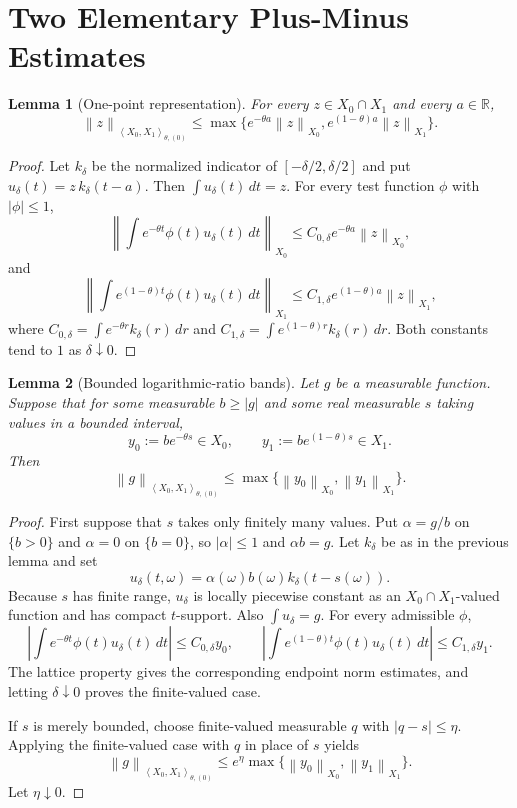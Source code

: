 \documentclass[11pt]{article}
\newtheorem{lemma}{Lemma}
\newcommand{\PM}{\left\langle X_0,X_1\right\rangle_{\theta,(0)}}
\newcommand{\norm}[1]{\left\lVert #1\right\rVert}
\begin{document}
\section*{Two Elementary Plus-Minus Estimates}

\begin{lemma}[One-point representation]
\label{lem:point}
For every $z\in X_0\cap X_1$ and every $a\in\mathbb R$,
\[
\norm{z}_{\PM}
\le
\max\{e^{-\theta a}\norm{z}_{X_0},
      e^{(1-\theta)a}\norm{z}_{X_1}\}.
\]
\end{lemma}

\begin{proof}
Let $k_\delta$ be the normalized indicator of
$[-\delta/2,\delta/2]$ and put
$u_\delta(t)=z\,k_\delta(t-a)$.  Then
$\int u_\delta(t)\,dt=z$.  For every test function $\phi$ with
$|\phi|\le1$,
\[
\left\|\int e^{-\theta t}\phi(t)u_\delta(t)\,dt\right\|_{X_0}
\le
C_{0,\delta}e^{-\theta a}\norm{z}_{X_0},
\]
and
\[
\left\|\int e^{(1-\theta)t}\phi(t)u_\delta(t)\,dt\right\|_{X_1}
\le
C_{1,\delta}e^{(1-\theta)a}\norm{z}_{X_1},
\]
where
$C_{0,\delta}=\int e^{-\theta r}k_\delta(r)\,dr$ and
$C_{1,\delta}=\int e^{(1-\theta)r}k_\delta(r)\,dr$.  Both constants
tend to $1$ as $\delta\downarrow0$.
\end{proof}

\begin{lemma}[Bounded logarithmic-ratio bands]
\label{lem:finite-band}
Let $g$ be a measurable function.  Suppose that for some measurable
$b\ge |g|$ and some real measurable $s$ taking values in a bounded
interval,
\[
y_0:=b e^{-\theta s}\in X_0,\qquad
y_1:=b e^{(1-\theta)s}\in X_1 .
\]
Then
\[
\norm{g}_{\PM}\le \max\{\norm{y_0}_{X_0},\norm{y_1}_{X_1}\}.
\]
\end{lemma}

\begin{proof}
First suppose that $s$ takes only finitely many values.  Put
$\alpha=g/b$ on $\{b>0\}$ and $\alpha=0$ on $\{b=0\}$, so
$|\alpha|\le1$ and $\alpha b=g$.  Let $k_\delta$ be as in the previous
lemma and set
\[
u_\delta(t,\omega)=\alpha(\omega)b(\omega)k_\delta(t-s(\omega)).
\]
Because $s$ has finite range, $u_\delta$ is locally piecewise constant
as an $X_0\cap X_1$-valued function and has compact $t$-support.  Also
$\int u_\delta=g$.  For every admissible $\phi$,
\[
\left|\int e^{-\theta t}\phi(t)u_\delta(t)\,dt\right|
\le C_{0,\delta} y_0,
\qquad
\left|\int e^{(1-\theta)t}\phi(t)u_\delta(t)\,dt\right|
\le C_{1,\delta} y_1 .
\]
The lattice property gives the corresponding endpoint norm estimates,
and letting $\delta\downarrow0$ proves the finite-valued case.

If $s$ is merely bounded, choose finite-valued measurable $q$ with
$|q-s|\le\eta$.  Applying the finite-valued case with $q$ in place of
$s$ yields
\[
\norm{g}_{\PM}
\le e^\eta\max\{\norm{y_0}_{X_0},\norm{y_1}_{X_1}\}.
\]
Let $\eta\downarrow0$.
\end{proof}
\end{document}
